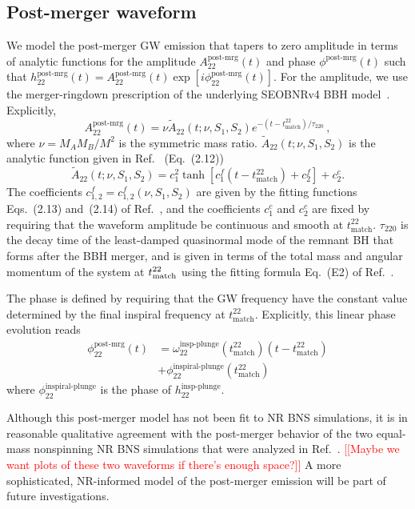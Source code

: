 \documentclass[prd,aps,letter,twocolumn,floatfix,notitlepage,nofootinbib]{revtex4-1}
\newcommand{\red}[1]{\textcolor{red}{#1}}
\begin{document}
\subsection{Post-merger waveform}

We model the post-merger GW emission that tapers to zero amplitude in terms of analytic functions for the amplitude $A_{22}^{\textrm{post-mrg}}(t)$ and phase $\phi^{\textrm{post-mrg}}(t)$ such that $h_{22}^{\textrm{post-mrg}}(t) = A_{22}^{\textrm{post-mrg}}(t) \exp{[i\phi_{22}^{\textrm{post-mrg}}(t)]}$. For the amplitude, we use the merger-ringdown prescription of the underlying SEOBNRv4 BBH model~\cite{Bohe:2016gbl}. Explicitly,
\begin{equation}
A_{22}^{\textrm{post-mrg}}(t)=\nu \tilde{A}_{22}(t; \nu, S_1, S_2)e^{-(t-t^{22}_{\textrm{match}})/\tau_{220}}\,,
\end{equation}
where $\nu=M_A M_B/M^2$ is the symmetric mass ratio. $\tilde{A}_{22}(t; \nu, S_1, S_2)$ is the analytic function given in Ref.~\cite{Bohe:2016gbl} (Eq.~(2.12))
\begin{equation}
\tilde{A}_{22}(t; \nu, S_1, S_2) = c_1^2\tanh[c_1^f(t-t_{\textrm{match}}^{22})+c_2^f]+c_2^c.
\end{equation}
The coefficients $c_{1,2}^f=c_{1,2}^f(\nu, S_1, S_2)$ are given by the fitting functions Eqs.~(2.13) and~(2.14) of Ref.~\cite{Bohe:2016gbl}, and the coefficients $c_1^c$ and $c_2^c$ are fixed by requiring that the waveform amplitude be continuous and smooth at $t^{22}_{\textrm{match}}$. $\tau_{220}$ is the decay time of the least-damped quasinormal mode of the remnant BH that forms after the BBH merger, and is given in terms of the total mass and angular momentum of the system at $t^{22}_{\rm match}$ using the fitting formula Eq.~(E2) of Ref.~\cite{Berti:2005ys}.

The phase is defined by requiring that the GW frequency have the constant value determined by the final inspiral frequency at $t_{\textrm{match}}^{22}$. Explicitly, this linear phase evolution reads
\begin{align}
\phi_{22}^{\textrm{post-mrg}}(t)&=\omega_{22}^{\textrm{insp-plunge}}(t_{\textrm{match}}^{22})(t-t_{\textrm{match}}^{22})\nonumber\\
&+\phi_{22}^{\textrm{inspiral-plunge}}(t_{\textrm{match}}^{22})\,
\end{align}
where $\phi_{22}^{\textrm{inspiral-plunge}}$ is the phase of $h_{22}^{\textrm{insp-plunge}}$. 

Although this post-merger model has not been fit to NR BNS simulations, it is in reasonable qualitative agreement with the post-merger behavior of the two equal-mass nonspinning NR BNS simulations that were analyzed in Ref.~\cite{Hinderer:2016eia}. \red{[[Maybe we want plots of these two waveforms if there's enough space?]]} A more sophisticated, NR-informed model of the post-merger emission will be part of future investigations. 
\end{document}
